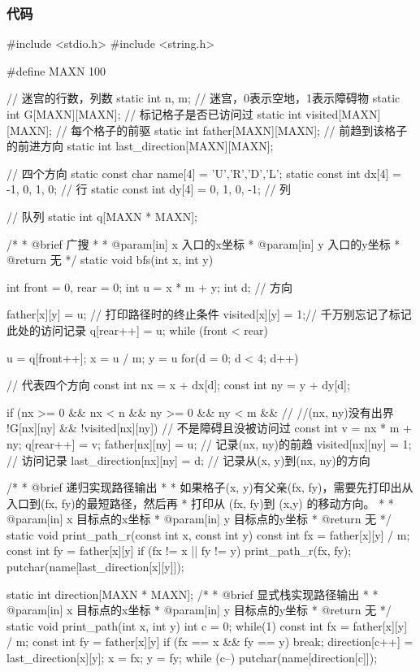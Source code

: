 \subsubsection{代码}
\begin{Codex}[label=maze.c]
#include <stdio.h>
#include <string.h>

#define MAXN 100

// 迷宫的行数，列数
static int n, m;
// 迷宫，0表示空地，1表示障碍物
static int G[MAXN][MAXN];
// 标记格子是否已访问过
static int visited[MAXN][MAXN];
// 每个格子的前驱
static int father[MAXN][MAXN];
// 前趋到该格子的前进方向
static int last_direction[MAXN][MAXN];

// 四个方向
static const char name[4] = {'U','R','D','L'};
static const int dx[4] = {-1, 0, 1, 0}; // 行
static const int dy[4] = {0, 1, 0, -1}; // 列

// 队列
static int q[MAXN * MAXN];

/*
 * @brief 广搜
 *
 * @param[in] x 入口的x坐标
 * @param[in] y 入口的y坐标
 * @return 无
 */
static void bfs(int x, int y) {
    int front = 0, rear = 0;
    int u = x * m + y;
    int d; // 方向
    
    father[x][y] = u; // 打印路径时的终止条件
    visited[x][y] = 1;// 千万别忘记了标记此处的访问记录
    q[rear++] = u;
    while (front < rear) {
        u = q[front++];
        x = u / m;	y = u %
        for(d = 0; d < 4; d++) { // 代表四个方向
            const int nx = x + dx[d];
            const int ny = y + dy[d];
            
            if (nx >= 0 && nx < n && ny >= 0 && ny < m &&  // //(nx, ny)没有出界
                !G[nx][ny] && !visited[nx][ny]) { // 不是障碍且没被访问过
                const int v = nx * m + ny;
                q[rear++] = v;
                father[nx][ny] = u; // 记录(nx, ny)的前趋
                visited[nx][ny] = 1; // 访问记录
                last_direction[nx][ny] = d; // 记录从(x, y)到(nx, ny)的方向
            }
        }
    }
}

/*
 * @brief 递归实现路径输出
 *
 * 如果格子(x, y)有父亲(fx, fy)，需要先打印出从入口到(fx, fy)的最短路径，然后再
 * 打印从 (fx, fy)到 (x,y) 的移动方向。
 *
 * @param[in] x 目标点的x坐标
 * @param[in] y 目标点的y坐标
 * @return 无
 */
static void print_path_r(const int x, const int y) {
    const int fx = father[x][y] / m;
    const int fy = father[x][y] %
    if (fx != x || fy != y) {
        print_path_r(fx, fy);
        putchar(name[last_direction[x][y]]);
    }
}

static int direction[MAXN * MAXN];
/*
 * @brief 显式栈实现路径输出
 *
 * @param[in] x 目标点的x坐标
 * @param[in] y 目标点的y坐标
 * @return 无
 */
static void print_path(int x, int y) {
    int c = 0;
    while(1) {
        const int fx = father[x][y] / m;
        const int fy = father[x][y] %
        if (fx == x && fy == y) break;
        direction[c++] = last_direction[x][y];
        x = fx;
        y = fy;
    }
    while (c--) {
        putchar(name[direction[c]]);
    }
}


\end{Codex}
